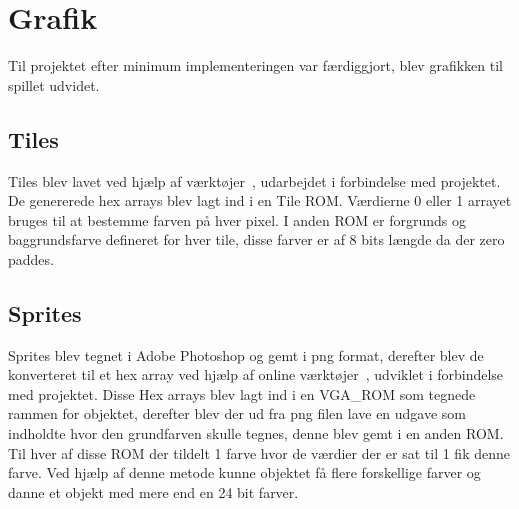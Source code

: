 \section{Grafik}
Til projektet efter minimum implementeringen var færdiggjort, blev grafikken til spillet udvidet. 


\subsection{Tiles}
Tiles blev lavet ved hjælp af værktøjer~\cite{minitools}, udarbejdet i forbindelse med projektet. De genererede hex arrays blev lagt ind i en Tile ROM. Værdierne 0 eller 1 arrayet bruges til at bestemme farven på hver pixel. I anden ROM er forgrunds og baggrundsfarve defineret for hver tile, disse farver er af 8 bits længde da der zero paddes.

\subsection{Sprites}
Sprites blev tegnet i Adobe Photoshop og gemt i png format, derefter blev de konverteret til et hex array ved hjælp af online værktøjer~\cite{minitools}, udviklet i forbindelse med projektet. Disse Hex arrays blev lagt ind i en VGA\_ROM som tegnede rammen for objektet, derefter blev der ud fra png filen lave en udgave som indholdte hvor den grundfarven skulle tegnes, denne blev gemt i en anden ROM. Til hver af disse ROM der tildelt 1 farve hvor de værdier der er sat til 1 fik denne farve. Ved hjælp af denne metode kunne objektet få flere forskellige farver og danne et objekt med mere end en 24 bit farver.